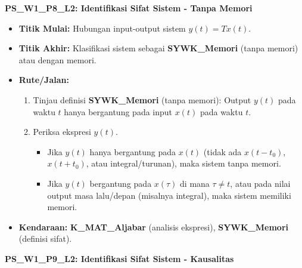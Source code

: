 \documentclass[
  letterpaper,
  DIV=11,
  numbers=noendperiod]{scrreprt}
\providecommand{\tightlist}{%
  \setlength{\itemsep}{0pt}\setlength{\parskip}{0pt}}\usepackage{longtable,booktabs,array}
\begin{document}
\textbf{PS\_W1\_P8\_L2: Identifikasi Sifat Sistem - Tanpa Memori}

\begin{itemize}
\tightlist
\item
  \textbf{Titik Mulai:} Hubungan input-output sistem \(y(t) = T{x(t)}\).
\item
  \textbf{Titik Akhir:} Klasifikasi sistem sebagai \textbf{SYWK\_Memori}
  (tanpa memori) atau dengan memori.
\item
  \textbf{Rute/Jalan:}

  \begin{enumerate}
  \def\labelenumi{\arabic{enumi}.}
  \tightlist
  \item
    Tinjau definisi \textbf{SYWK\_Memori} (tanpa memori): Output
    \(y(t)\) pada waktu \(t\) hanya bergantung pada input \(x(t)\) pada
    waktu \(t\).
  \item
    Periksa ekspresi \(y(t)\).

    \begin{itemize}
    \tightlist
    \item
      Jika \(y(t)\) hanya bergantung pada \(x(t)\) (tidak ada
      \(x(t-t_0)\), \(x(t+t_0)\), atau integral/turunan), maka sistem
      tanpa memori.
    \item
      Jika \(y(t)\) bergantung pada \(x(\tau)\) di mana \(\tau \neq t\),
      atau pada nilai output masa lalu/depan (misalnya integral), maka
      sistem memiliki memori.
    \end{itemize}
  \end{enumerate}
\item
  \textbf{Kendaraan:} \textbf{K\_MAT\_Aljabar} (analisis ekspresi),
  \textbf{SYWK\_Memori} (definisi sifat).
\end{itemize}

\textbf{PS\_W1\_P9\_L2: Identifikasi Sifat Sistem - Kausalitas}
\end{document}

